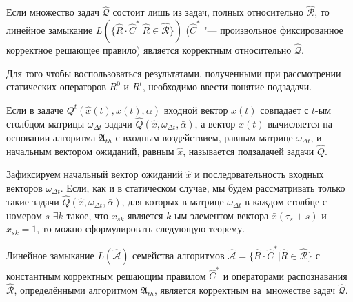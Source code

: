 \begin{Pred}
	\label{pred:correctness_d}
	Если множество задач $\hat{\mathcal Q}$ состоит лишь из задач, полных относительно $\hat{\mathcal R}$, то линейное замыкание $L(\{\hat R{\cdot}\hat C^*|\hat R\in\hat{\mathcal R}\})$ ($\hat C^*$ "--- произвольное фиксированное корректное решающее правило) является корректным относительно $\hat{\mathcal Q}$.
\end{Pred}
	
Для того чтобы воспользоваться результатами, полученными при рассмотрении статических операторов $R^0$ и $R^t$, необходимо ввести понятие подзадачи.

\begin{Def}
	Если в задаче $Q^t(\hat x(t),\bar x(t),\bar\alpha)$ входной вектор $\bar x(t)$ совпадает с $t$-ым столбцом матрицы $\omega_{\Delta t}$ задачи $\hat Q(\hat x,\omega_{\Delta t},\bar\alpha)$, а вектор $\hat x(t)$ вычисляется на основании алгоритма $\mathfrak A_{th}$ с входным воздействием, равным матрице $\omega_{\Delta t}$, и начальным вектором ожиданий, равным $\hat x$, называется подзадачей задачи $\hat Q$.
\end{Def}

Зафиксируем начальный вектор ожиданий $\hat{x}$ и последовательность входных векторов $\omega_{\Delta{t}}$. Если, как и в статическом случае, мы будем рассматривать только такие задачи $\hat{Q}(\hat{x},\omega_{\Delta{t}},\bar{\alpha})$, для которых в матрице $\omega_{\Delta{t}}$ в каждом столбце с номером $s$ ${\exists}k$ такое, что $x_{sk}$ является $k$-ым элементом вектора $\bar{x}(\tau_s+s)$ и $x_{sk}=1$, то можно сформулировать следующую теорему.

\begin{Theorem}\label{th:correctness_d}
	Линейное замыкание $L(\hat{\mathcal A})$ семейства алгоритмов $\hat{\mathcal A}=\{\hat{R}{\cdot}\hat{C}^*|\hat R\in\hat{\mathcal R}\}$ с константным корректным решающим правилом $\hat C^*$ и операторами распознавания $\hat{\mathcal R}$, определёнными алгоритмом $\mathfrak{A}_{th}$, является корректным на~множестве задач $\hat{\mathcal Q}$.
\end{Theorem}

